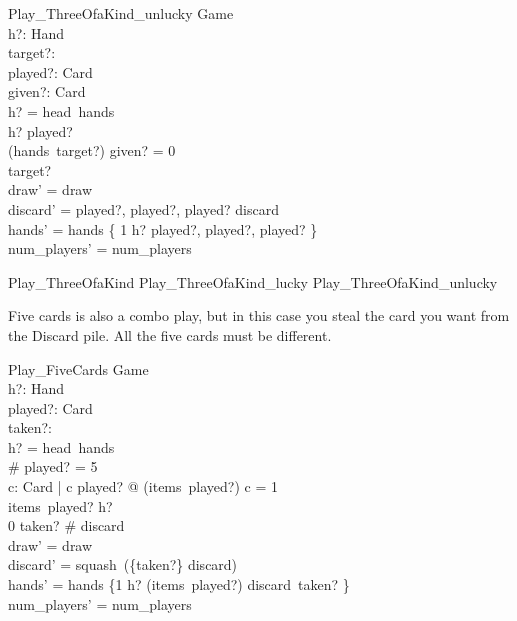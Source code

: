 \documentclass[11pt, fuzz]{article}
\begin{document}
\begin{schema}{Play\_ThreeOfaKind\_unlucky}
    \Delta Game \\
    h?: Hand \\
    target?: \nat \\
    played?: Card \\
    given?: Card \\
\where
    h? = head~hands \\
    h? \bcount played?  \\
    (hands~target?) \bcount given? = 0 \\
    target?  \\
    draw' = draw \\
    discard' = \langle played?, played?, played? \rangle \cat discard \\
    hands' = hands \oplus \{ 1 \mapsto h? \uminus \lbag played?, played?, played? \rbag \} \\
    num\_players' = num\_players
\end{schema}

\begin{zed}
Play\_ThreeOfaKind  Play\_ThreeOfaKind\_lucky \lor Play\_ThreeOfaKind\_unlucky
\end{zed}


Five cards is also a combo play, but in this case you steal the card you want from the Discard pile. All the five cards must be different. 

\begin{schema}{Play\_FiveCards}
    \Delta Game \\
    h?: Hand \\
    played?: \seq Card \\
    taken?: \nat \\
\where
    h? = head~hands \\
    \# played? = 5 \\
    \forall c: Card | c \in \ran played? @ (items~played?) \bcount c = 1 \\ 
    items~played? \subbageq h? \\
    0 \leq taken? \leq \# discard \\
    draw' = draw \\
    discard' = squash~(\{taken?\} \ndres discard) \\ 
    hands' = hands \oplus \{1 \mapsto h? \uminus (items~played?) \uplus \lbag discard~taken? \rbag \} \\

    num\_players' = num\_players 
\end{schema}
\end{document}
